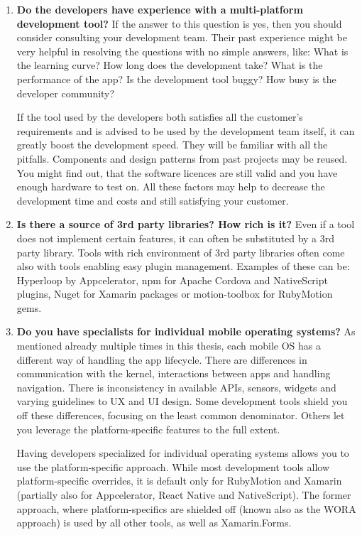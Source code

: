\documentclass[english,master,public,dept460,male,cpdeclaration,oneside]{diploma}
\begin{document}
\begin{enumerate}
	\item \textbf{Do the developers have experience with a multi-platform development tool? }
	If the answer to this question is yes, then you should consider consulting your development team. Their past experience might be very helpful in resolving the questions with no simple answers, like: What is the learning curve? How long does the development take? What is the performance of the app? Is the development tool buggy? How busy is the developer community?
	
	If the tool used by the developers both satisfies all the customer’s requirements and is advised to be used by the development team itself, it can greatly boost the development speed. They will be familiar with all the pitfalls. Components and design patterns from past projects may be reused. You might find out, that the software licences are still valid and you have enough hardware to test on. All these factors may help to decrease the development time and costs and still satisfying your customer.
	
	\item \textbf{Is there a source of 3rd party libraries? How rich is it? }
	Even if a tool does not implement certain features, it can often be substituted by a 3rd party library. Tools with rich environment of 3rd party libraries often come also with tools enabling easy plugin management. Examples of these can be: Hyperloop by Appcelerator, npm for Apache Cordova and NativeScript plugins, Nuget for Xamarin packages or motion-toolbox for RubyMotion gems.
	
	\item \textbf{Do you have specialists for individual mobile operating systems? }
	As mentioned already multiple times in this thesis, each mobile OS has a different way of handling the app lifecycle. There are differences in communication with the kernel, interactions between apps and handling navigation. There is inconsistency in available APIs, sensors, widgets and varying guidelines to UX and UI design. Some development tools shield you off these differences, focusing on the least common denominator. Others let you leverage the platform-specific features to the full extent.
	
	Having developers specialized for individual operating systems allows you to use the platform-specific approach. While most development tools allow platform-specific overrides, it is default only for RubyMotion and Xamarin (partially also for Appcelerator, React Native and NativeScript). The former approach, where platform-specifics are shielded off (known also as the WORA approach) is used by all other tools, as well as Xamarin.Forms.
	

\end{enumerate}
\end{document}
